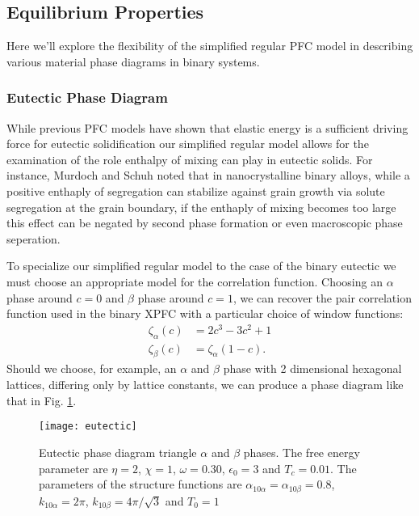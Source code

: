\subsection{Equilibrium Properties} %

Here we'll explore the flexibility of the simplified regular PFC model in
describing various material phase diagrams in binary systems.

\subsubsection{Eutectic Phase Diagram} %

While previous PFC models have shown that elastic energy is a sufficient
driving force for eutectic solidification our simplified regular model allows
for the examination of the role enthalpy of mixing can play in eutectic solids.
For instance, Murdoch and Schuh noted that in nanocrystalline binary alloys,
while a positive enthaply of segregation can stabilize against grain growth via
solute segregation at the grain boundary, if the enthaply of mixing becomes too
large this effect can be negated by second phase formation or even macroscopic
phase seperation\cite{MURDOCH13}. 

To specialize our simplified regular model to the case of the binary eutectic
we must choose an appropriate model for the correlation function. Choosing an
$\alpha$ phase around $c = 0$ and $\beta$ phase around $c = 1$, we can recover
the pair correlation function used in the binary XPFC with a
particular choice of window functions: 
%
\begin{align}
   \zeta_\alpha(c) &= 2c^3 - 3c^2 + 1 \\
   \zeta_\beta(c) &= \zeta_\alpha(1 - c).
\end{align}
%
Should we choose, for example, an $\alpha$ and $\beta$ phase with 2 dimensional
hexagonal lattices, differing only by lattice constants, we can produce a phase
diagram like that in Fig. \ref{eutectic}.  

\begin{figure}[h]
    \centering	
    \texttt{[image: eutectic]}
    \caption[Eutectic Phase Diagram]{
        \label{eutectic} Eutectic phase diagram triangle $\alpha$ and $\beta$
        phases. The free energy parameter are $\eta = 2$, $\chi = 1$,
        $\omega=0.30$, $\epsilon_0 = 3$ and $T_c = 0.01$. The parameters of the
        structure functions are $\alpha_{10\alpha} = \alpha_{10\beta} = 0.8$,
        $k_{10\alpha} = 2\pi$, $k_{10\beta} = 4\pi/\sqrt{3}$ and $T_0 = 1$
    }
\end{figure}

